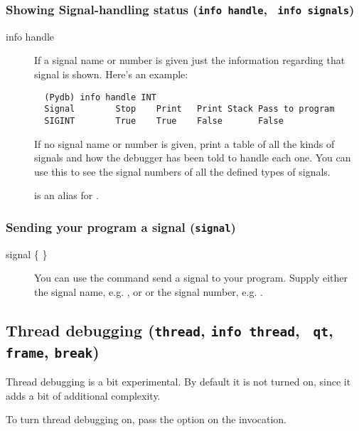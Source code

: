 \subsubsection{Showing Signal-handling status ({\tt info handle}, {\tt
    info signals})}\label{command:info-handle}
\begin{description}
\item[info handle ]
If a signal name or number is given just the information regarding
that signal is shown. Here's an example:

\begin{verbatim}
  (Pydb) info handle INT
  Signal        Stop	Print	Print Stack	Pass to program
  SIGINT        True	True	False      	False
\end{verbatim}


If no signal name or number is given, print a table of all the kinds
of signals and how the debugger has been told to handle each one.  You
can use this to see the signal numbers of all the defined types of
signals.  

 is an alias for .

\end{description}

\subsubsection{Sending your program a signal ({\tt signal})}
\begin{description}
\item[signal \{ \code{\Large{|}} \}]
You can use the  command send a signal to your
program. Supply either the signal name, e.g. , or
 or the signal number, e.g. .
\end{description}

\subsection{Thread debugging ({\tt thread}, {\tt info thread}, {\tt
    qt}, {\tt frame}, {\tt break})\label{subsection-thread}}

Thread debugging is a bit experimental. By default it is not turned
on, since it adds a bit of additional complexity. 

To turn thread debugging on, pass the  option on the
 invocation.

